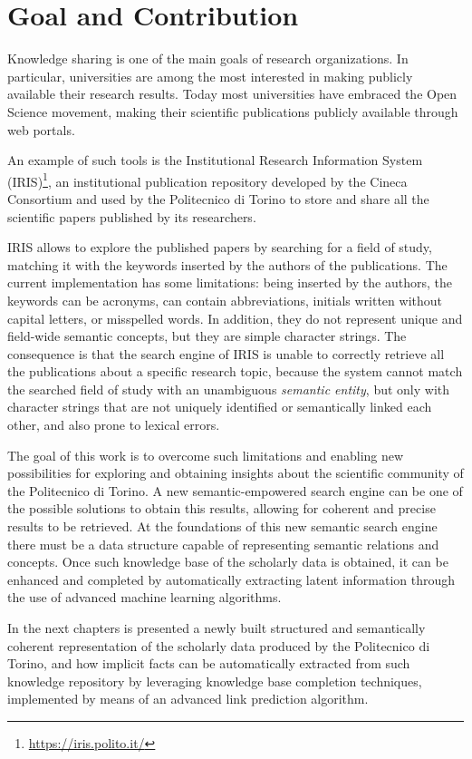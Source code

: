 \documentclass[%
    corpo=13.5pt,
    twoside,
    oldstyle,
    tipotesi=magistrale,
    greek,
    evenboxes
]{toptesi}
\begin{document}
\section{Goal and Contribution}

Knowledge sharing is one of the main goals of research organizations. In
particular, universities are among the most interested in making publicly
available their research results. Today most universities have embraced the Open
Science movement, making their scientific publications publicly available
through web portals.

An example of such tools is the Institutional Research Information
System (IRIS)\footnote{\url{https://iris.polito.it/}}, an
institutional publication repository developed by the Cineca Consortium and
used by the Politecnico di Torino to store and share all the scientific papers
published by its researchers.

IRIS allows to explore the published papers by searching for a field of study,
matching it with the keywords inserted by the authors of the publications.
The current implementation has some limitations: being
inserted by the authors, the keywords can be acronyms, can contain
abbreviations, initials written without capital letters, or misspelled words.
In addition, they do not represent unique and field-wide semantic concepts, but
they are simple character strings.
The consequence is that the search engine of IRIS is unable to correctly
retrieve all the publications about a specific research topic, because the
system cannot match the searched field of study with an unambiguous
\emph{semantic entity}, but only with character strings that are not
uniquely identified or semantically linked each other, and also prone to
lexical errors.

The goal of this work is to overcome such limitations and enabling new possibilities for
exploring and obtaining insights about the scientific community of the
Politecnico di Torino. A new semantic-empowered search engine can be
one of the possible solutions to obtain this results, allowing for coherent and
precise results to be retrieved.
At the foundations of this new semantic search engine there must be a data
structure capable of representing semantic relations and concepts. Once such
knowledge base of the scholarly data is obtained, it can be enhanced and
completed by automatically extracting latent information through the use of
advanced machine learning algorithms.

In the next chapters is presented a newly built structured and
semantically coherent representation of the scholarly data produced by the
Politecnico di Torino, and how implicit facts can be automatically
extracted from such knowledge repository by leveraging knowledge base
completion techniques, implemented by means of an advanced link prediction
algorithm.
\end{document}
